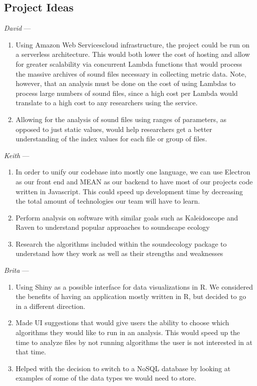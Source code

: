 \subsection{Project Ideas}
\textit{David} ---
\begin{enumerate}
    \item Using Amazon Web Services\textquotesingle  cloud infrastructure, the project could be run on a serverless architecture. This would both lower the cost of hosting and allow for greater scalability via concurrent Lambda functions that would process the massive archives of sound files necessary in collecting metric data. Note, however, that an analysis must be done on the cost of using Lambdas to process large numbers of sound files, since a high cost per Lambda would translate to a high cost to any researchers using the service.
    \item Allowing for the analysis of sound files using ranges of parameters, as opposed to just static values, would help researchers get a better understanding of the index values for each file or group of files.
\end{enumerate}

\textit{Keith} ---
\begin{enumerate}
    \item In order to unify our codebase into mostly one language, we can use Electron as our front end and MEAN as our backend to have most of our project\textquotesingle s code written in Javascript. This could speed up development time by decreasing the total amount of technologies our team will have to learn.
    \item Perform analysis on software with similar goals such as Kaleidoscope and Raven to understand popular approaches to soundscape ecology
    \item Research the algorithms included within the soundecology package to understand how they work as well as their strengths and weaknesses
\end{enumerate}

\textit{Brita} ---
\begin{enumerate}
    \item Using Shiny as a possible interface for data visualizations in R. We considered the benefits of having an application mostly written in R, but decided to go in a different direction.
    \item Made UI suggestions that would give users the ability to choose which algorithms they would like to run in an analysis. This would speed up the time to analyze files by not running algorithms the user is not interested in at that time.
    \item Helped with the decision to switch to a NoSQL database by looking at examples of some of the data types we would need to store.
\end{enumerate}

